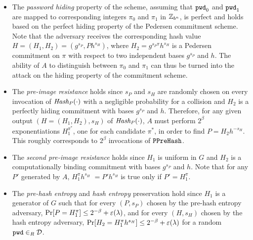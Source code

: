 \begin{itemize}
\item
The \emph{password hiding} property of the scheme, assuming that $\mathtt{pwd}_0$ and $\mathtt{pwd}_1$ are mapped to corresponding integers $\pi_0$ and $\pi_1$ in $\mathbb{Z}_{b^n}$, is perfect and holds based on the perfect hiding property of the Pedersen commitment scheme. Note that the adversary receives the corresponding hash value $H=(H_1, H_2)=(g^{s_P}, Ph^{s_H})$, where $H_2= g^{s_P\pi}h^{s_H}$ is a Pedersen commitment on $\pi$ with respect to two independent bases $g^{s_P}$ and $h$. The ability of $A$ to distinguish between $\pi_0$ and $\pi_1$ can thus be turned into the attack on the hiding property of the commitment scheme.

\item
The \emph{pre-image resistance} holds since $s_P$ and $s_H$ are randomly chosen on every invocation of $\mathit{Hash_P}(\cdot)$ with a negligible probability for a collision and $H_2$ is a perfectly hiding commitment with bases $g^{s_P}$ and $h$. Therefore, for any given output $(H=(H_1, H_2), s_H)$ of $\mathit{Hash_P}(\cdot)$, $A$ must perform $2^\beta$ exponentiations $H_1^{\pi^\ast}$, one for each candidate $\pi^\ast$, in order to find $P = H_2h^{-s_H}$. This roughly corresponds to $2^\beta$ invocations of $\mathtt{PPreHash}$.

\item
The \emph{second pre-image resistance} holds since $H_1$ is uniform in $G$ and $H_2$ is a computationally binding commitment with bases $g^{s_P}$ and $h$. Note that for any $P'$ generated by $A$, $H_1^\pi h^{s_H}$ $=P'h^{s_H}$ is true only if $P'=H_1^\pi$.
	
	\item
The \emph{pre-hash entropy} and \emph{hash entropy} preservation hold since $H_1$ is a generator of $G$ such that for every $(P,s_P)$ chosen by the pre-hash entropy adversary, $\Pr[P=H_1^\pi]\leq2^{-\beta}+\varepsilon(\lambda)$, and for every $(H,s_H)$ chosen by the hash entropy adversary, $\Pr[H_2=H_1^\pi h^{s_H}]\leq2^{-\beta}+\varepsilon(\lambda)$ for a random $\mathtt{pwd}\in_R\mathcal{D}$.

\end{itemize}

